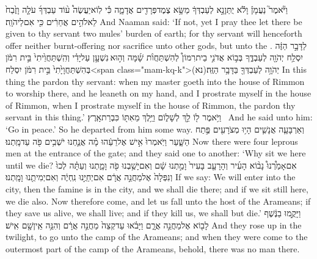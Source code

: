 {וַיֹּ֘אמֶר֮ נַעֲמָן֒ וָלֹ֕א יֻתַּן\maqqaf נָ֣א לְעַבְדְּךָ֔ מַשָּׂ֥א צֶמֶד\maqqaf פְּרָדִ֖ים אֲדָמָ֑ה כִּ֡י לֽוֹא\maqqaf יַעֲשֶׂה֩ ע֨וֹד עַבְדְּךָ֜ עֹלָ֤ה וָזֶ֙בַח֙ לֵאלֹהִ֣ים אֲחֵרִ֔ים כִּ֖י אִם\maqqaf לַיהֹוָֽה׃}
{And Naaman said: ‘If not, yet I pray thee let there be given to thy servant two mules’ burden of earth; for thy servant will henceforth offer neither burnt-offering nor sacrifice unto other gods, but unto the \lord.}
{לַדָּבָ֣ר הַזֶּ֔ה יִסְלַ֥ח יְהֹוָ֖ה לְעַבְדֶּ֑ךָ בְּב֣וֹא אֲדֹנִ֣י בֵית\maqqaf רִמּוֹן֩ לְהִשְׁתַּחֲוֺ֨ת שָׁ֜מָּה וְה֣וּא \legarmeh  נִשְׁעָ֣ן עַל\maqqaf יָדִ֗י וְהִֽשְׁתַּחֲוֵ֙יתִי֙ בֵּ֣ית רִמֹּ֔ן בְּהִשְׁתַּחֲוָיָ֙תִי֙ בֵּ֣ית רִמֹּ֔ן יִסְלַח\maqqaf <span class="mam-kq-k">(נא)\maqqaf יְהֹוָ֥ה לְעַבְדְּךָ֖ בַּדָּבָ֥ר הַזֶּֽה׃}
{In this thing the \lord\space pardon thy servant: when my master goeth into the house of Rimmon to worship there, and he leaneth on my hand, and I prostrate myself in the house of Rimmon, when I prostrate myself in the house of Rimmon, the \lord\space pardon thy servant in this thing.’}
{וַיֹּ֥אמֶר ל֖וֹ לֵ֣ךְ לְשָׁל֑וֹם וַיֵּ֥לֶךְ מֵאִתּ֖וֹ כִּבְרַת\maqqaf אָֽרֶץ׃ \setuma }
{And he said unto him: ‘Go in peace.’ So he departed from him some way.}
\newperek
{}
\label{haft_28}
\setcounter{chap}{7}
\setcounter{verse}{3}
{וְאַרְבָּעָ֧ה אֲנָשִׁ֛ים הָי֥וּ מְצֹרָעִ֖ים פֶּ֣תַח הַשָּׁ֑עַר וַיֹּֽאמְרוּ֙ אִ֣ישׁ אֶל\maqqaf רֵעֵ֔הוּ מָ֗ה אֲנַ֛חְנוּ יֹשְׁבִ֥ים פֹּ֖ה עַד\maqqaf מָֽתְנוּ׃}
{Now there were four leprous men at the entrance of the gate; and they said one to another: ‘Why sit we here until we die?}
{אִם\maqqaf אָמַ֩רְנוּ֩ נָב֨וֹא הָעִ֜יר וְהָרָעָ֤ב בָּעִיר֙ וָמַ֣תְנוּ שָׁ֔ם וְאִם\maqqaf יָשַׁ֥בְנוּ פֹ֖ה וָמָ֑תְנוּ וְעַתָּ֗ה לְכוּ֙ וְנִפְּלָה֙ אֶל\maqqaf מַחֲנֵ֣ה אֲרָ֔ם אִם\maqqaf יְחַיֻּ֣נוּ נִֽחְיֶ֔ה וְאִם\maqqaf יְמִיתֻ֖נוּ וָמָֽתְנוּ׃}
{If we say: We will enter into the city, then the famine is in the city, and we shall die there; and if we sit still here, we die also. Now therefore come, and let us fall unto the host of the Arameans; if they save us alive, we shall live; and if they kill us, we shall but die.’}
{וַיָּקֻ֣מוּ בַנֶּ֔שֶׁף לָב֖וֹא אֶל\maqqaf מַחֲנֵ֣ה אֲרָ֑ם וַיָּבֹ֗אוּ עַד\maqqaf קְצֵה֙ מַחֲנֵ֣ה אֲרָ֔ם וְהִנֵּ֥ה אֵֽין\maqqaf שָׁ֖ם אִֽישׁ׃}
{And they rose up in the twilight, to go unto the camp of the Arameans; and when they were come to the outermost part of the camp of the Arameans, behold, there was no man there.}
